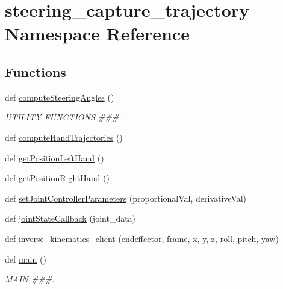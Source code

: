\hypertarget{namespacesteering__capture__trajectory}{}\section{steering\+\_\+capture\+\_\+trajectory Namespace Reference}
\label{namespacesteering__capture__trajectory}
\subsection*{Functions}
\begin{DoxyCompactItemize}
\item 
def \mbox{\hyperlink{namespacesteering__capture__trajectory_a4b5f9adad77bffee303df87fa109e3ce}{compute\+Steering\+Angles}} ()
\begin{DoxyCompactList}\small\item\em U\+T\+I\+L\+I\+TY F\+U\+N\+C\+T\+I\+O\+NS \#\#\#. \end{DoxyCompactList}\item 
def \mbox{\hyperlink{namespacesteering__capture__trajectory_a5c680d4059a6f6632b82e3f8faf773b7}{compute\+Hand\+Trajectories}} ()
\item 
def \mbox{\hyperlink{namespacesteering__capture__trajectory_a0997cf216eac9c4faad98f7ec77d90b2}{get\+Position\+Left\+Hand}} ()
\item 
def \mbox{\hyperlink{namespacesteering__capture__trajectory_aef42b4c4dfb5a6a191011fd3ba71f79d}{get\+Position\+Right\+Hand}} ()
\item 
def \mbox{\hyperlink{namespacesteering__capture__trajectory_a65590c72bcb93df963d8d7aedf481c59}{set\+Joint\+Controller\+Parameters}} (proportional\+Val, derivative\+Val)
\item 
def \mbox{\hyperlink{namespacesteering__capture__trajectory_a03e8abc1b79c8cfb86f6822b4fa3f54d}{joint\+State\+Callback}} (joint\+\_\+data)
\item 
def \mbox{\hyperlink{namespacesteering__capture__trajectory_a4bfce21cb55ab2e49bfd284ede718f63}{inverse\+\_\+kinematics\+\_\+client}} (endeffector, frame, x, y, z, roll, pitch, yaw)
\item 
def \mbox{\hyperlink{namespacesteering__capture__trajectory_ac791b493a465a5c409dd07ec030ff1cd}{main}} ()
\begin{DoxyCompactList}\small\item\em M\+A\+IN \#\#\#. \end{DoxyCompactList}\end{DoxyCompactItemize}
